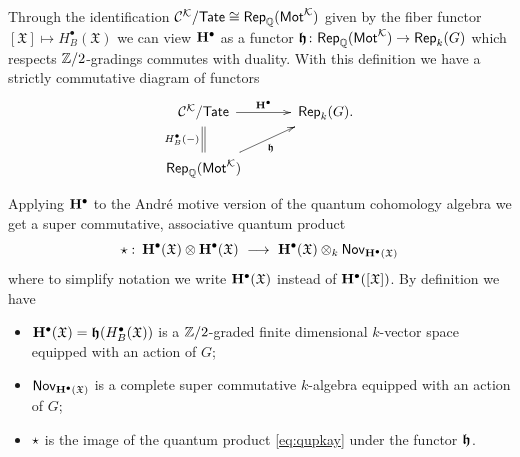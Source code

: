 \documentclass[twoside,leqno]{article}
\numberwithin{equation}{section}
\theoremstyle{plain}
\theoremstyle{definition}
\begin{document}
Through the identification $\mathcal{C}^{\mathcal K}/\mathsf{Tate} \cong
\mathsf{Rep}_{\mathbb Q}(\mathsf{Mot}^{\mathcal K})$ given by the fiber functor \linebreak 
$[\mathfrak{X}] \mapsto H^{\bullet}_{B}(\mathfrak{X})$ we can view
$\mathbf{H}^{\bullet}$ as a functor $\boldsymbol{\mathfrak{h}}\colon\mathsf{Rep}_{\mathbb Q}(\mathsf{Mot}^{\mathcal K}) \to \mathsf{Rep}_{k}(G)$ which
respects $\mathbb Z/2$-gradings commutes with duality. With this definition
we have a strictly commutative diagram of functors
\[
 \xymatrix@R-0.5pc@M+0.2pc@C+0.5pc{
 \CA{\kay}/\mathsf{Tate} \ar[r]^-{\bfH^{\bullet}}  \ar@{=}[d]_-{H^{\bullet}_{B}(-)} &
 \mathsf{Rep}_{k}(G).
 \\
 \mathsf{Rep}_{\bbQ}(\motM^{\kay}) \ar[ru]_-{\bfh} &}
\]
Applying $\mathbf{H}^{\bullet}$ to the Andr\'{e} motive version of the quantum
cohomology algebra we get a super commutative,  associative quantum product
\begin{equation} \label{eq:qupGk}
 \star \, \colon \, \mathbf{H}^{\bullet}(\mathfrak{X})\otimes \mathbf{H}^{\bullet}(\mathfrak{X})
 \ \longrightarrow \ \mathbf{H}^{\bullet}(\mathfrak{X}) \otimes_{k}
 \mathsf{Nov}_{\mathbf{H}^{\bullet}(\mathfrak{X})}
\end{equation}
where to simplify notation we write $\mathbf{H}^{\bullet}(\mathfrak{X})$ instead of
$\mathbf{H}^{\bullet}([\mathfrak{X}])$. By definition we have
\begin{itemize}
\item $\mathbf{H}^{\bullet}(\mathfrak{X}) =
  \boldsymbol{\mathfrak{h}}(H^{\bullet}_{B}(\mathfrak{X}))$ is a $\mathbb Z/2$-graded
  finite dimensional $k$-vector
space equipped with an action of $G$;
\item $\mathsf{Nov}_{\mathbf{H}^{\bullet}(\mathfrak{X})}$ is
  a complete super commutative $k$-algebra
  equipped with an action of $G$;
\item $\star$ is the image of the quantum product \eqref{eq:qupkay} under the
  functor $\boldsymbol{\mathfrak{h}}$.
\end{itemize}
\end{document}
